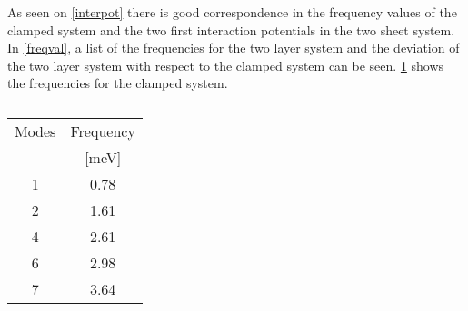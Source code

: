 As seen on \cref{interpot} there is good correspondence in the frequency values of the clamped system and the two first interaction potentials in the two sheet system. In \cref{freqval}, a list of the frequencies for the two layer system and the deviation of the two layer system with respect to the clamped system can be seen. \cref{freqclamp} shows the frequencies for the clamped system. 
\begin{table}
  \centering
  \begin{tabular}{c|c}
    \toprule
     Modes &     Frequency \\
           &   [\si{\meV}] \\
    \hline \hline
           1 &        0.78 \\
           2 &        1.61 \\
           4 &        2.61 \\
           6 &        2.98 \\
           7 &        3.64 \\
    \bottomrule
  \end{tabular}
  \caption{}
  \label{freqclamp}
\end{table}
